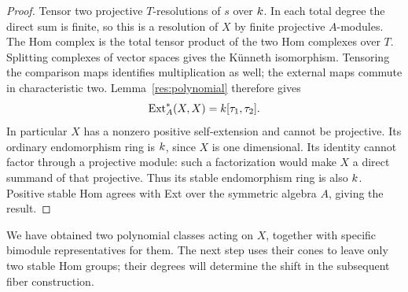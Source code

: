 \begin{proof}
Tensor two projective $T$-resolutions of $s$ over $k$. In each total
degree the direct sum is finite, so this is a resolution of $X$ by
finite projective $A$-modules. The Hom complex is the total tensor
product of the two Hom complexes over $T$. Splitting complexes of
vector spaces gives the K\"unneth isomorphism. Tensoring the comparison
maps identifies multiplication as well; the external maps commute in
characteristic two. Lemma~\ref{res:polynomial} therefore gives
\[
 \operatorname{Ext}_A^*(X,X)=k[\tau_1,\tau_2].
\]
In particular $X$ has a nonzero positive self-extension and cannot be
projective. Its ordinary endomorphism ring is $k$, since $X$ is one
dimensional. Its identity cannot factor through a projective module:
such a factorization would make $X$ a direct summand of that projective.
Thus its stable endomorphism ring is also $k$. Positive stable Hom
agrees with Ext over the symmetric algebra $A$, giving the result.
\end{proof}

We have obtained two polynomial classes acting on $X$, together with
specific bimodule representatives for them. The next step uses their
cones to leave only two stable Hom groups; their degrees will determine
the shift in the subsequent fiber construction.
